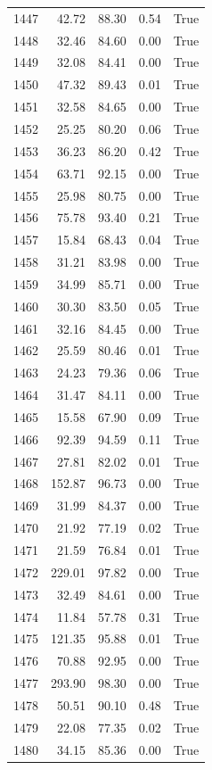 \begin{longtable}{rrrrr}
1447 & 42.72 & 88.30 & 0.54 & True \\
1448 & 32.46 & 84.60 & 0.00 & True \\
1449 & 32.08 & 84.41 & 0.00 & True \\
1450 & 47.32 & 89.43 & 0.01 & True \\
1451 & 32.58 & 84.65 & 0.00 & True \\
1452 & 25.25 & 80.20 & 0.06 & True \\
1453 & 36.23 & 86.20 & 0.42 & True \\
1454 & 63.71 & 92.15 & 0.00 & True \\
1455 & 25.98 & 80.75 & 0.00 & True \\
1456 & 75.78 & 93.40 & 0.21 & True \\
1457 & 15.84 & 68.43 & 0.04 & True \\
1458 & 31.21 & 83.98 & 0.00 & True \\
1459 & 34.99 & 85.71 & 0.00 & True \\
1460 & 30.30 & 83.50 & 0.05 & True \\
1461 & 32.16 & 84.45 & 0.00 & True \\
1462 & 25.59 & 80.46 & 0.01 & True \\
1463 & 24.23 & 79.36 & 0.06 & True \\
1464 & 31.47 & 84.11 & 0.00 & True \\
1465 & 15.58 & 67.90 & 0.09 & True \\
1466 & 92.39 & 94.59 & 0.11 & True \\
1467 & 27.81 & 82.02 & 0.01 & True \\
1468 & 152.87 & 96.73 & 0.00 & True \\
1469 & 31.99 & 84.37 & 0.00 & True \\
1470 & 21.92 & 77.19 & 0.02 & True \\
1471 & 21.59 & 76.84 & 0.01 & True \\
1472 & 229.01 & 97.82 & 0.00 & True \\
1473 & 32.49 & 84.61 & 0.00 & True \\
1474 & 11.84 & 57.78 & 0.31 & True \\
1475 & 121.35 & 95.88 & 0.01 & True \\
1476 & 70.88 & 92.95 & 0.00 & True \\
1477 & 293.90 & 98.30 & 0.00 & True \\
1478 & 50.51 & 90.10 & 0.48 & True \\
1479 & 22.08 & 77.35 & 0.02 & True \\
1480 & 34.15 & 85.36 & 0.00 & True \\

\end{longtable}
